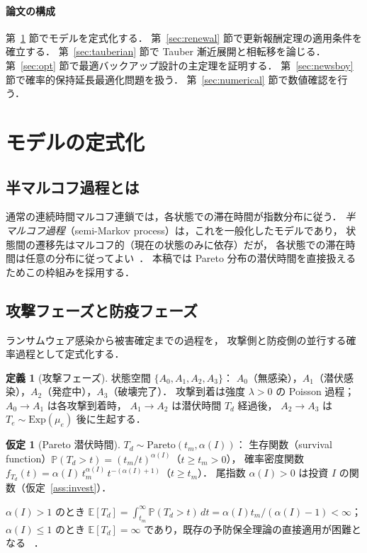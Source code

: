 \documentclass[12pt,a4paper]{article}
\theoremstyle{plain}
\theoremstyle{definition}
\newtheorem{definition}[theorem]{定義}
\newtheorem{assumption}[theorem]{仮定}
\theoremstyle{remark}
\newcommand{\E}{\mathbb{E}}
\newcommand{\Prob}{\mathbb{P}}
\newcommand{\alphI}{\alpha(I)}
\begin{document}
\paragraph{論文の構成}
第~\ref{sec:model} 節でモデルを定式化する．
第~\ref{sec:renewal} 節で更新報酬定理の適用条件を確立する．
第~\ref{sec:tauberian} 節で Tauber 漸近展開と相転移を論じる．
第~\ref{sec:opt} 節で最適バックアップ設計の主定理を証明する．
第~\ref{sec:newsboy} 節で確率的保持延長最適化問題を扱う．
第~\ref{sec:numerical} 節で数値確認を行う．

\section{モデルの定式化}
\label{sec:model}

\subsection{半マルコフ過程とは}

\begin{tcolorbox}[mathbox, title={半マルコフ過程（Semi-Markov Process）の概念}]
通常の連続時間マルコフ連鎖では，各状態での滞在時間が指数分布に従う．
\emph{半マルコフ過程}（semi-Markov process）は，これを一般化したモデルであり，
状態間の遷移先はマルコフ的（現在の状態のみに依存）だが，
各状態での滞在時間は任意の分布に従ってよい~\cite{cinlar1975,limnios2001,howard1971}．
本稿では Pareto 分布の潜伏時間を直接扱えるためこの枠組みを採用する．
\end{tcolorbox}

\subsection{攻撃フェーズと防疫フェーズ}

ランサムウェア感染から被害確定までの過程を，
攻撃側と防疫側の並行する確率過程として定式化する．

\begin{definition}[攻撃フェーズ]\label{def:attack}
状態空間 $\{A_0,A_1,A_2,A_3\}$：
$A_0$（無感染），$A_1$（潜伏感染），$A_2$（発症中），$A_3$（破壊完了）．
攻撃到着は強度 $\lambda>0$ の Poisson 過程；
$A_0\to A_1$ は各攻撃到着時，
$A_1\to A_2$ は潜伏時間 $T_d$ 経過後，
$A_2\to A_3$ は $T_e\sim\mathrm{Exp}(\mu_e)$ 後に生起する．
\end{definition}

\begin{assumption}[Pareto 潜伏時間]\label{ass:pareto}
$T_d\sim\mathrm{Pareto}(t_m,\alphI)$：
生存関数（survival function）$\Prob(T_d>t)=(t_m/t)^{\alphI}$（$t\ge t_m>0$），
確率密度関数 $f_{T_d}(t)=\alphI\,t_m^{\alphI}\,t^{-(\alphI+1)}$（$t\ge t_m$）．
尾指数 $\alphI>0$ は投資 $I$ の関数（仮定~\ref{ass:invest}）．

$\alphI>1$ のとき $\E[T_d]=\int_{t_m}^\infty\Prob(T_d>t)\,dt=\alphI t_m/(\alphI-1)<\infty$；
$\alphI\le1$ のとき $\E[T_d]=\infty$ であり，既存の予防保全理論の直接適用が困難となる
~\cite{embrechts1997,dehaan2006}．
\end{assumption}
\end{document}
